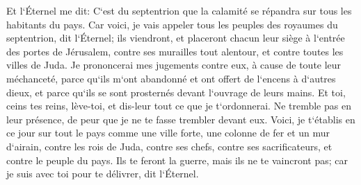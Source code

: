 \verse Et l`Éternel me dit: C`est du septentrion que la calamité se répandra sur tous les habitants du pays. 
\verse Car voici, je vais appeler tous les peuples des royaumes du septentrion, dit l`Éternel; ils viendront, et placeront chacun leur siège à l`entrée des portes de Jérusalem, contre ses murailles tout alentour, et contre toutes les villes de Juda. 
\verse Je prononcerai mes jugements contre eux, à cause de toute leur méchanceté, parce qu`ils m`ont abandonné et ont offert de l`encens à d`autres dieux, et parce qu`ils se sont prosternés devant l`ouvrage de leurs mains. 
\verse Et toi, ceins tes reins, lève-toi, et dis-leur tout ce que je t`ordonnerai. Ne tremble pas en leur présence, de peur que je ne te fasse trembler devant eux. 
\verse Voici, je t`établis en ce jour sur tout le pays comme une ville forte, une colonne de fer et un mur d`airain, contre les rois de Juda, contre ses chefs, contre ses sacrificateurs, et contre le peuple du pays. 
\verse Ils te feront la guerre, mais ils ne te vaincront pas; car je suis avec toi pour te délivrer, dit l`Éternel. 

